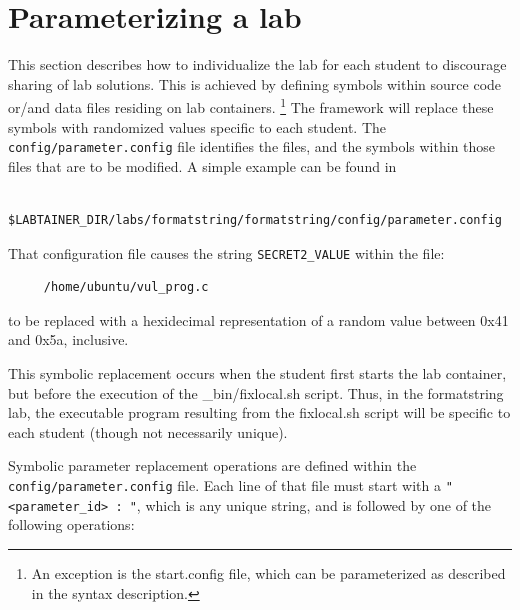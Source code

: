 \documentclass[12pt]{article}
\begin{document}
\section{Parameterizing a lab}
\label{parameterize}
This section describes how to individualize the lab for each student to discourage
sharing of lab solutions.  This is achieved by defining symbols within source 
code or/and data files residing on lab containers. \footnote{An exception is the
start.config file, which can be parameterized as described in the syntax description.}  
The framework will replace these symbols with randomized values
specific to each student.  The {\tt config/parameter.config} file identifies the files, and
the symbols within those files that are to be modified.  A simple example can be found in 
\begin{verbatim}
    $LABTAINER_DIR/labs/formatstring/formatstring/config/parameter.config
\end{verbatim}

That configuration file causes the string {\tt SECRET2\_VALUE} within the file:
\begin{verbatim}
     /home/ubuntu/vul_prog.c
\end{verbatim}
to be replaced with a hexidecimal representation of a random value
between 0x41 and 0x5a, inclusive.

This symbolic replacement occurs when the student first starts the lab container,
but before the execution of the \_bin/fixlocal.sh script.  Thus, in the formatstring
lab, the executable program resulting from the fixlocal.sh script will be specific
to each student (though not necessarily unique).

Symbolic parameter replacement operations are defined within the {\tt config/parameter.config} file.
Each line of that file must start with a \verb!"<parameter_id> : "!, which is any unique string, and
is followed by one of the following operations:
\end{document}
